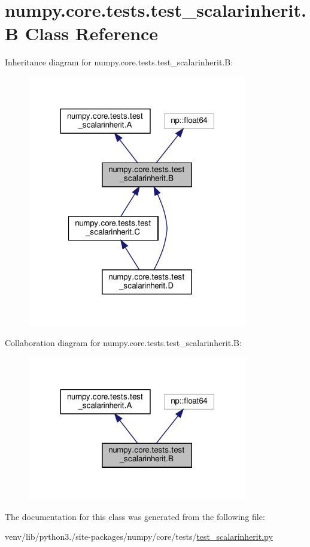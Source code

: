 \hypertarget{classnumpy_1_1core_1_1tests_1_1test__scalarinherit_1_1B}{}\section{numpy.\+core.\+tests.\+test\+\_\+scalarinherit.\+B Class Reference}
\label{classnumpy_1_1core_1_1tests_1_1test__scalarinherit_1_1B}


Inheritance diagram for numpy.\+core.\+tests.\+test\+\_\+scalarinherit.\+B\+:
\nopagebreak
\begin{figure}[H]
\begin{center}
\leavevmode
\includegraphics[width=272pt]{classnumpy_1_1core_1_1tests_1_1test__scalarinherit_1_1B__inherit__graph}
\end{center}
\end{figure}


Collaboration diagram for numpy.\+core.\+tests.\+test\+\_\+scalarinherit.\+B\+:
\nopagebreak
\begin{figure}[H]
\begin{center}
\leavevmode
\includegraphics[width=272pt]{classnumpy_1_1core_1_1tests_1_1test__scalarinherit_1_1B__coll__graph}
\end{center}
\end{figure}


The documentation for this class was generated from the following file\+:\begin{DoxyCompactItemize}
\item 
venv/lib/python3./site-\/packages/numpy/core/tests/\hyperlink{test__scalarinherit_8py}{test\+\_\+scalarinherit.\+py}\end{DoxyCompactItemize}
